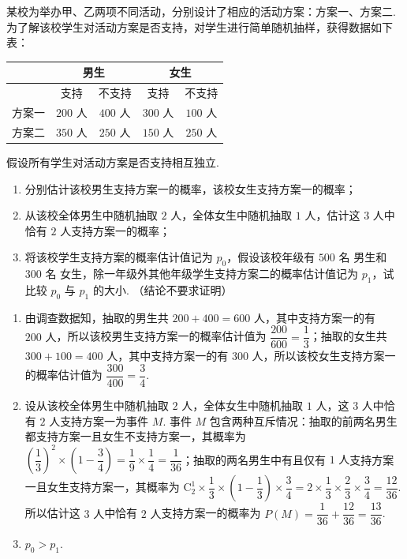 \begin{problem}
某校为举办甲、乙两项不同活动，分别设计了相应的活动方案：方案一、方案二. 为了解该校学生对活动方案是否支持，对学生进行简单随机抽样，获得数据如下表：

\begin{center}
\begin{tabular}{c|cc|cc}
\hline
& \multicolumn{2}{c|}{男生} & \multicolumn{2}{c}{女生} \\
\hline
& 支持 & 不支持 & 支持 & 不支持 \\
\hline
方案一 & \(200\text{ 人}\) & \(400\text{ 人}\) & \(300\text{ 人}\) & \(100\text{ 人}\) \\
方案二 & \(350\text{ 人}\) & \(250\text{ 人}\) & \(150\text{ 人}\) & \(250\text{ 人}\) \\
\hline
\end{tabular}
\end{center}

假设所有学生对活动方案是否支持相互独立.

\begin{enumerate}
    \item 分别估计该校男生支持方案一的概率，该校女生支持方案一的概率；
    \item 从该校全体男生中随机抽取 \(2\text{ 人}\)，全体女生中随机抽取 \(1\text{ 人}\)，估计这 \(3\text{ 人}\)中恰有 \(2\text{ 人}\)支持方案一的概率；
    \item 将该校学生支持方案的概率估计值记为 \(p_0\)，假设该校年级有 \(500\text{ 名}\) 男生和 \(300\text{ 名}\) 女生，除一年级外其他年级学生支持方案二的概率估计值记为 \(p_1\)，试比较 \(p_0\) 与 \(p_1\) 的大小. （结论不要求证明）
\end{enumerate}
\end{problem}

\begin{solution}
\begin{enumerate}
    \item 由调查数据知，抽取的男生共 \(200+400=600\text{ 人}\)，其中支持方案一的有 \(200\text{ 人}\)，所以该校男生支持方案一的概率估计值为 \(\dfrac{200}{600}=\dfrac13\)；抽取的女生共 \(300+100=400\text{ 人}\)，其中支持方案一的有 \(300\text{ 人}\)，所以该校女生支持方案一的概率估计值为 \(\dfrac{300}{400}=\dfrac34\).
    \item 设从该校全体男生中随机抽取 \(2\text{ 人}\)，全体女生中随机抽取 \(1\text{ 人}\)，这 \(3\text{ 人}\)中恰有 \(2\text{ 人}\)支持方案一为事件 \(M\). 事件 \(M\) 包含两种互斥情况：抽取的前两名男生都支持方案一且女生不支持方案一，其概率为 \(\left(\dfrac13\right)^2\times\left(1-\dfrac34\right)=\dfrac19\times\dfrac14=\dfrac{1}{36}\)；抽取的两名男生中有且仅有 \(1\text{ 人}\)支持方案一且女生支持方案一，其概率为 \(\mathrm C_2^1\times\dfrac13\times\left(1-\dfrac13\right)\times\dfrac34=2\times\dfrac13\times\dfrac23\times\dfrac34=\dfrac{12}{36}\). 所以估计这 \(3\text{ 人}\)中恰有 \(2\text{ 人}\)支持方案一的概率为 \(P(M)=\dfrac{1}{36}+\dfrac{12}{36}=\dfrac{13}{36}\).
    \item \(p_0>p_1\).
\end{enumerate}
\end{solution}

